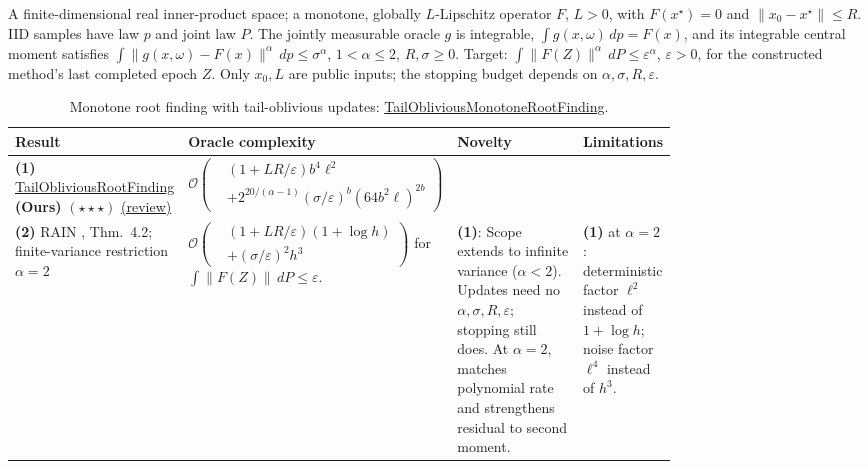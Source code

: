 \begin{table}[tp]
\centering
\caption{Monotone root finding with tail-oblivious updates: \href{https://github.com/k3nfalt/longtails/blob/main/LongTails/Setups/TailObliviousMonotoneRootFinding.lean}{TailObliviousMonotoneRootFinding}.}\label{tab:TailObliviousMonotoneRootFinding}
\parbox{\linewidth}{\footnotesize A finite-dimensional real inner-product space; a monotone, globally $L$-Lipschitz operator $F$, $L>0$, with $F(x^\star)=0$ and $\|x_0-x^\star\|\le R$. IID samples have law $p$ and joint law $P$. The jointly measurable oracle $g$ is integrable, $\int g(x,\omega)\,dp=F(x)$, and its integrable central moment satisfies $\int\|g(x,\omega)-F(x)\|^\alpha\,dp\le\sigma^\alpha$, $1<\alpha\le2$, $R,\sigma\ge0$. Target: $\int\|F(Z)\|^\alpha\,dP\le\varepsilon^\alpha$, $\varepsilon>0$, for the constructed method's last completed epoch $Z$. Only $x_0,L$ are public inputs; the stopping budget depends on $\alpha,\sigma,R,\varepsilon$.}\par\smallskip
\begin{threeparttable}
\footnotesize
\setlength{\tabcolsep}{4pt}\renewcommand{\arraystretch}{1.25}
\begin{tabularx}{\linewidth}{@{}>{\raggedright\arraybackslash}p{0.20\linewidth}>{\raggedright\arraybackslash}p{0.32\linewidth}>{\raggedright\arraybackslash}p{0.25\linewidth}>{\raggedright\arraybackslash}X@{}}
\toprule
\textbf{Result} & \textbf{Oracle complexity} & \textbf{Novelty} & \textbf{Limitations} \\
\midrule
\textbf{(1)} \href{https://github.com/k3nfalt/longtails/blob/main/LongTails/Theorems/TailObliviousRootFinding.lean}{Tail\allowbreak Oblivious\allowbreak Root\allowbreak Finding} \textbf{(Ours)} $(\star\star\star)$ \href{https://github.com/k3nfalt/longtails/blob/main/scripts/reviews/TailObliviousRootFinding.md}{(review)} & $\mathcal{O}\!\left(\begin{aligned}&(1+LR/\varepsilon)b^4\ell^2\\&+2^{20/(\alpha-1)}(\sigma/\varepsilon)^b(64b^2\ell)^{2b}\end{aligned}\right)$ & & \\
\midrule[1.2pt]
\textbf{(2)} RAIN \citep{tailChenLuoV4}, Thm.~4.2; finite-variance restriction $\alpha=2$ & $\mathcal{O}\!\left(\begin{aligned}&(1+LR/\varepsilon)(1+\log h)\\&+(\sigma/\varepsilon)^2h^3\end{aligned}\right)$ for $\int\|F(Z)\|\,dP\le\varepsilon$. & \textbf{(1)}: Scope extends to infinite variance ($\alpha<2$). Updates need no $\alpha,\sigma,R,\varepsilon$; stopping still does. At $\alpha=2$, matches polynomial rate and strengthens residual to second moment. & \textbf{(1)} at $\alpha=2$: deterministic factor $\ell^2$ instead of $1+\log h$; noise factor $\ell^4$ instead of $h^3$. \\

\end{tabularx}
\end{threeparttable}
\end{table}
